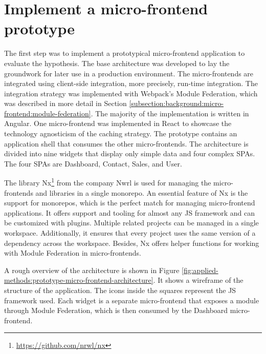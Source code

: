 \section{Implement a micro-frontend prototype}\label{section:applied-methods:prototypical-implementation}

The first step was to implement a prototypical micro-frontend application to evaluate the hypothesis. The base architecture was developed to lay the groundwork for later use in a production environment. The micro-frontends are integrated using client-side integration, more precisely, run-time integration. The integration strategy was implemented with Webpack's Module Federation, which was described in more detail in Section \ref{subsection:background:micro-frontend:module-federation}. The majority of the implementation is written in Angular. One micro-frontend was implemented in React to showcase the technology agnosticism of the caching strategy. The prototype contains an application shell that consumes the other micro-frontends. The architecture is divided into nine widgets that display only simple data and four complex 
\acp{SPA}. The four \acp{SPA} are Dashboard, Contact, Sales, and User.

\bigskip

\noindent The library Nx\footnote{\url{https://github.com/nrwl/nx}} from the company Nwrl is used for managing the micro-frontends and libraries in a single monorepo. An essential feature of Nx is the support for monorepos, which is the perfect match for managing micro-frontend applications. It offers support and tooling for almost any \ac{JS} framework and can be customized with plugins. Multiple related projects can be managed in a single workspace. Additionally, it ensures that every project uses the same version of a dependency across the workspace. Besides, Nx offers helper functions for working with Module Federation in micro-frontends. \cite{misc:-:applied-methods:intro-to-nx}

\bigskip

\noindent A rough overview of the architecture is shown in Figure \ref{fig:applied-methods:prototype-micro-frontend-architecture}. It shows a wireframe of the structure of the application. The icons inside the squares represent the \ac{JS} framework used. Each widget is a separate micro-frontend that exposes a module through Module Federation, which is then consumed by the Dashboard micro-frontend.

